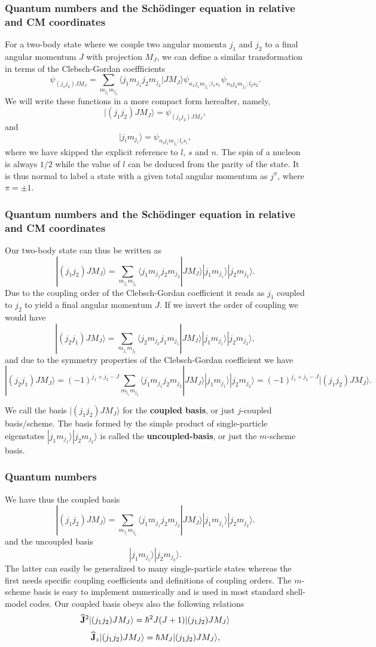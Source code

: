 \documentclass[compress]{beamer}
\newcommand{\OP}[1]{{\bf\widehat{#1}}}
\begin{document}
\frame
{
\frametitle{Quantum numbers and the Sch\"odinger equation in relative and CM coordinates}
\begin{small}
{\scriptsize
For a two-body state where we couple two angular momenta $j_1$ and $j_2$ to a final
angular momentum $J$ with projection $M_J$, we can define a similar transformation in terms
of the Clebsch-Gordan coeffficients
\[
\psi_{(j_1j_2)JM_J}=\sum_{m_{j_1}m_{j_2}}\langle j_1m_{j_1}j_2m_{j_2}|JM_J\rangle\psi_{n_1j_1m_{j_1};l_1s_1}\psi_{n_2j_2m_{j_2};l_2s_2}.
\]
We will write these functions in a more compact form hereafter, namely,
\[
|(j_1j_2)JM_J\rangle=\psi_{(j_1j_2)JM_J},
\]
and 
\[
|j_im_{j_i}\rangle=\psi_{n_ij_im_{j_i};l_is_i},
\]
where we have skipped the explicit reference to $l$, $s$ and $n$. The spin of a nucleon is always $1/2$ while the value of $l$ can be deduced from the parity of the state.
It is thus normal to label a state with a given total angular momentum as 
$j^{\pi}$, where $\pi=\pm 1$. 
}
\end{small}
}


\frame
{
\frametitle{Quantum numbers and the Sch\"odinger equation in relative and CM coordinates}
\begin{small}
{\scriptsize
Our two-body state can thus be written as 
\[
|(j_1j_2)JM_J\rangle=\sum_{m_{j_1}m_{j_2}}\langle j_1m_{j_1}j_2m_{j_2}|JM_J\rangle|j_1m_{j_1}\rangle|j_2m_{j_2}\rangle.
\]
Due to the coupling order of the Clebsch-Gordan coefficient it reads as 
$j_1$ coupled to $j_2$ to yield a final angular momentum $J$. If we invert the order of coupling we would have
\[
|(j_2j_1)JM_J\rangle=\sum_{m_{j_1}m_{j_2}}\langle j_2m_{j_2}j_1m_{j_1}|JM_J\rangle|j_1m_{j_1}\rangle|j_2m_{j_2}\rangle,
\]
and due to the symmetry properties of the Clebsch-Gordan coefficient we have
\[
|(j_2j_1)JM_J\rangle=(-1)^{j_1+j_2-J}\sum_{m_{j_1}m_{j_2}}\langle j_1m_{j_1}j_2m_{j_2}|JM_J\rangle|j_1m_{j_1}\rangle|j_2m_{j_2}\rangle=(-1)^{j_1+j_2-J}|(j_1j_2)JM_J\rangle.
\]

We call the basis $|(j_1j_2)JM_J\rangle$ for the {\bf coupled basis}, or just $j$-coupled basis/scheme. The basis formed by the simple product of single-particle eigenstates 
$|j_1m_{j_1}\rangle|j_2m_{j_2}\rangle$ is called the {\bf uncoupled-basis}, or just the $m$-scheme basis. 
}
\end{small}
}


\frame
{
\frametitle{Quantum numbers}
\begin{small}
{\scriptsize
We have thus the coupled basis 
\[
|(j_1j_2)JM_J\rangle=\sum_{m_{j_1}m_{j_2}}\langle j_1m_{j_1}j_2m_{j_2}|JM_J\rangle|j_1m_{j_1}\rangle|j_2m_{j_2}\rangle.
\]
and the uncoupled basis 
\[
|j_1m_{j_1}\rangle|j_2m_{j_2}\rangle.
\]
The latter can easily be generalized to many single-particle states whereas the first 
needs specific coupling coefficients and definitions of coupling orders. 
The $m$-scheme basis is easy to implement numerically and is used in most standard shell-model codes. 
Our coupled basis obeys also the following relations
\[
   \OP{J}^2|(j_1j_2)JM_J\rangle=\hbar^2J(J+1)|(j_1j_2)JM_J\rangle
\]
\[
   \OP{J}_z|(j_1j_2)JM_J\rangle=\hbar M_J|(j_1j_2)JM_J\rangle,
\]
}
\end{small}
}
\end{document}
